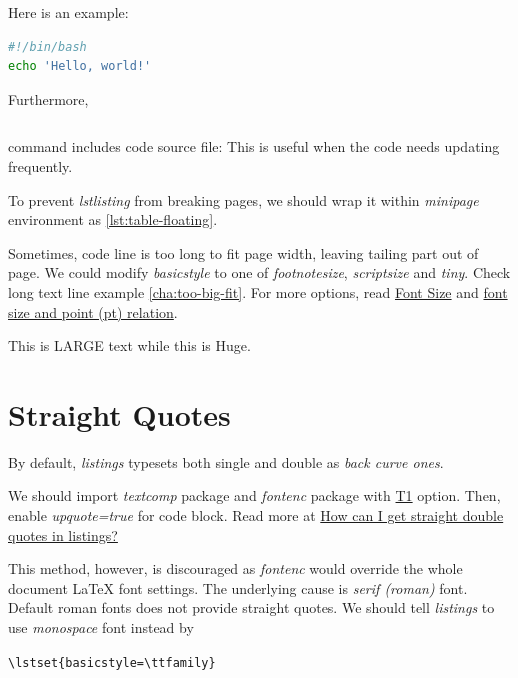 Here is an example:

\begin{lstlisting}[language=bash,caption={Bash},frame=single]
#!/bin/bash
echo 'Hello, world!'
\end{lstlisting}

Furthermore,
\begin{lstlisting}[language=TeX,caption={Include code file},breaklines]

\end{lstlisting}
command includes code source file:
 This is useful when the code needs
updating frequently.

To prevent \textit{lstlisting} from breaking pages, we should wrap
it within \textit{minipage} environment as \ref{lst:table-floating}.

Sometimes, code line is too long to fit page width, leaving
tailing part out of page. We could modify \textit{basicstyle} to
one of \textit{footnotesize}, \textit{scriptsize} and
\textit{tiny}. Check long text line example
\ref{cha:too-big-fit}. For more options, read
\href{https://tug.org/texinfohtml/latex2e.html#Font-sizes}{Font
  Size} and \href{https://tex.stackexchange.com/q/24599}{font size
  and point (pt) relation}.

{\LARGE This is LARGE text} {\Huge while this is Huge}.

\section{Straight Quotes}
\label{sec:straight-quotes}

By default, \textit{listings} typesets both single and double as
\textit{back curve ones}.

We should import \textit{textcomp} package and \textit{fontenc}
package with \href{https://tex.stackexchange.com/a/677}{T1}
option. Then, enable \textit{upquote=true} for code block. Read
more at \href{https://tex.stackexchange.com/q/166790}{How can I
  get straight double quotes in listings?}

This method, however, is discouraged as \textit{fontenc} would
override the whole document \LaTeX{} font settings. The underlying
cause is \textit{serif (roman)} font. Default roman fonts does not
provide straight quotes. We should tell \textit{listings} to use
\textit{monospace} font instead by

\begin{center}
  \verb|\lstset{basicstyle=\ttfamily}|
\end{center}

